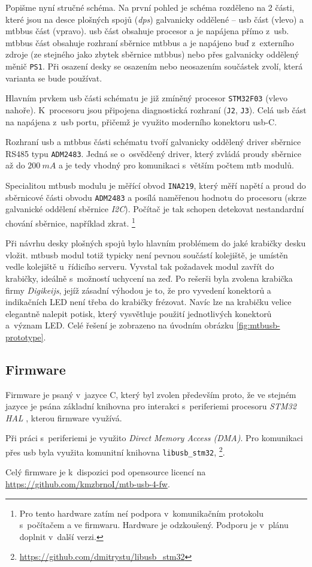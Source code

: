 Popišme nyní stručné schéma. Na první pohled je schéma rozděleno na 2 části,
které jsou na desce plošných spojů (\textit{\gls{dps}}) galvanicky oddělené –
\gls{usb} část (vlevo) a \gls{mtbbus} část (vpravo). \gls{usb} část obsahuje
procesor a je napájena přímo z~\gls{usb}. \gls{mtbbus} část obsahuje rozhraní
sběrnice \gls{mtbbus} a je napájeno buď z~externího zdroje (ze stejného jako
zbytek sběrnice \gls{mtbbus}) nebo přes galvanicky oddělený měnič \texttt{PS1}.
Při osazení desky se osazením nebo neosazením součástek zvolí, která varianta
se bude používat.

Hlavním prvkem \gls{usb} části schématu je již zmíněný procesor
\texttt{STM32F03} (vlevo nahoře). K~procesoru jsou připojena diagnostická
rozhraní (\texttt{J2}, \texttt{J3}). Celá \gls{usb} část na napájena z~\gls{usb}
portu, přičemž je využito moderního konektoru \gls{usb}-C.

Rozhraní \gls{usb} a \gls{mtbbus} části schématu tvoří galvanicky oddělený
driver sběrnice RS485 typu \texttt{ADM2483}. Jedná se o~osvědčený driver,
který zvládá proudy sběrnice až do $200~mA$ \cite{adm2483-datasheet} a je tedy
vhodný pro komunikaci s~větším počtem \gls{mtb} modulů.

Specialitou \gls{mtbusb} modulu je měřící obvod \texttt{INA219}, který měří
napětí a proud do sběrnicové části obvodu \texttt{ADM2483} a posílá naměřenou
hodnotu do procesoru (skrze galvanické oddělení sběrnice \textit{I2C}). Počítač
je tak schopen detekovat nestandardní chování sběrnice, například zkrat.
\footnote{Pro tento hardware zatím neí podpora v~komunikačním protokolu
s~počítačem a ve firmwaru. Hardware je odzkoušený. Podporu je v~plánu doplnit
v~další verzi.}

Při návrhu desky plošných spojů bylo hlavním problémem do jaké krabičky desku
vložit. \gls{mtbusb} modul totiž typicky není pevnou součástí kolejiště, je
umístěn vedle kolejiště u~řídicího serveru. Vyvstal tak požadavek modul zavřít
do krabičky, ideálně s~možností uchycení na zeď. Po rešerši byla zvolena krabička
firmy \textit{Digikeijs}, jejíž zásadní výhodou je to, že pro vyvedení konektorů
a indikačních LED není třeba do krabičky frézovat. Navíc lze na krabičku velice
elegantně nalepit potisk, který vysvětluje použití jednotlivých konektorů
a~význam LED. Celé řešení je zobrazeno na úvodním obrázku
\ref{fig:mtbusb-prototype}.


\subsection{Firmware}

Firmware je psaný v~jazyce C, který byl zvolen především proto, že ve stejném
jazyce je psána základní knihovna pro interakci s~periferiemi procesoru
\textit{STM32 HAL} \cite{stm32-hal}, kterou firmware využívá.

Při práci s~periferiemi je využito \textit{Direct Memory Access (DMA)}. Pro
komunikaci přes \gls{usb} byla využita komunitní knihovna \texttt{libusb\_stm32},
\footnote{\url{https://github.com/dmitrystu/libusb_stm32}}.

Celý firmware je k~dispozici pod opensource licencí na
\url{https://github.com/kmzbrnoI/mtb-usb-4-fw}.
